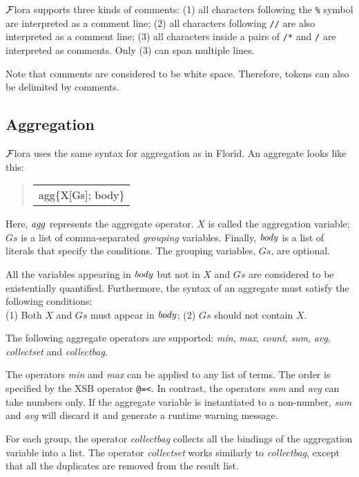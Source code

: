 \documentclass[11pt]{article}
\newenvironment{qrules}{\begin{quote}\sf\begin{tabular}[t]{l}}%
{\end{tabular}\end{quote}}
\newcommand{\FLORA}{{\mbox{${\cal F}${\sc lora}}}\xspace}
\newcommand{\FLORID}{{\mbox{\sc Florid}}\xspace}
\begin{document}
\FLORA supports three kinds of comments: (1) all characters following the
{\tt \%} symbol are interpreted as a comment line; (2) all characters
following {\tt //} are also interpreted as a comment line;
(3) all characters inside a pairs of {\tt /*} and {\tt */} are
interpreted as comments. Only (3) can span multiple lines.

Note that comments are considered to be white space. Therefore, tokens can
also be delimited by comments.


\subsection{Aggregation}

\FLORA uses the same syntax for aggregation as in \FLORID. An aggregate
looks like this:
\begin{qrules}
agg\{X[Gs]; body\}
\end{qrules}
Here, ${\it agg}$ represents the aggregate operator. $X$ is called the
aggregation variable; $Gs$ is a list of comma-separated \emph{grouping}
variables. Finally, ${\it body}$ is a list of literals that specify the
conditions. The grouping variables, $Gs$, are optional.

All the variables appearing in ${\it body}$ but not in $X$ and $Gs$ are
considered to be existentially \mbox{quantified}. Furthermore, the syntax of an
aggregate must satisfy the following conditions:\\
(1) Both $X$ and $Gs$ must
appear in ${\it body}$; (2) $Gs$ should not contain $X$.

The following aggregate operators are supported: {\it min}, {\it max},
{\it count}, {\it sum}, {\it avg}, {\it collectset} and {\it collectbag}.

The operators {\it min} and {\it max} can be applied to any list of terms. The
order is specified by the XSB operator {\tt @=<}.  In contrast, the operators
{\it sum} and {\it avg} can take numbers only. If the aggregate variable is
instantiated to a non-number, {\it sum} and {\it avg} will discard it and
generate a runtime warning message.

For each group, the operator {\it collectbag} collects all the bindings of
the aggregation variable into a list. The operator {\it collectset} works
similarly to {\it collectbag}, except that all the duplicates are removed
from the result list.
\end{document}
